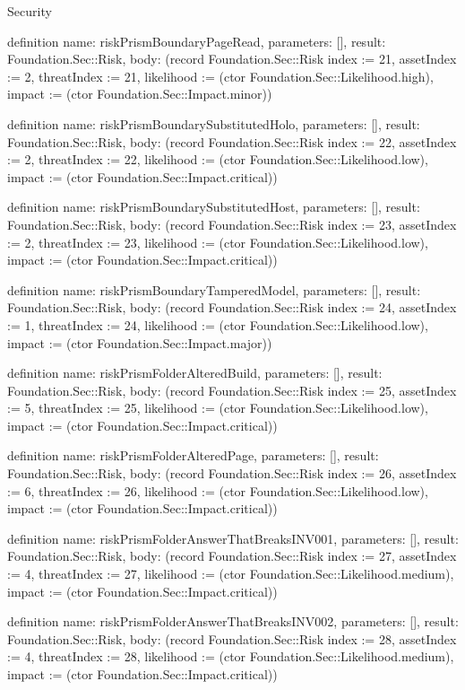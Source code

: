 \begin{lexlean}{Security}
\begin{semanticmodule}
definition{
  name: riskPrismBoundaryPageRead,
  parameters: [],
  result: Foundation.Sec::Risk,
  body: (record Foundation.Sec::Risk {index := 21, assetIndex := 2, threatIndex := 21, likelihood := (ctor Foundation.Sec::Likelihood.high), impact := (ctor Foundation.Sec::Impact.minor)})
}

definition{
  name: riskPrismBoundarySubstitutedHolo,
  parameters: [],
  result: Foundation.Sec::Risk,
  body: (record Foundation.Sec::Risk {index := 22, assetIndex := 2, threatIndex := 22, likelihood := (ctor Foundation.Sec::Likelihood.low), impact := (ctor Foundation.Sec::Impact.critical)})
}

definition{
  name: riskPrismBoundarySubstitutedHost,
  parameters: [],
  result: Foundation.Sec::Risk,
  body: (record Foundation.Sec::Risk {index := 23, assetIndex := 2, threatIndex := 23, likelihood := (ctor Foundation.Sec::Likelihood.low), impact := (ctor Foundation.Sec::Impact.critical)})
}

definition{
  name: riskPrismBoundaryTamperedModel,
  parameters: [],
  result: Foundation.Sec::Risk,
  body: (record Foundation.Sec::Risk {index := 24, assetIndex := 1, threatIndex := 24, likelihood := (ctor Foundation.Sec::Likelihood.low), impact := (ctor Foundation.Sec::Impact.major)})
}

definition{
  name: riskPrismFolderAlteredBuild,
  parameters: [],
  result: Foundation.Sec::Risk,
  body: (record Foundation.Sec::Risk {index := 25, assetIndex := 5, threatIndex := 25, likelihood := (ctor Foundation.Sec::Likelihood.low), impact := (ctor Foundation.Sec::Impact.critical)})
}

definition{
  name: riskPrismFolderAlteredPage,
  parameters: [],
  result: Foundation.Sec::Risk,
  body: (record Foundation.Sec::Risk {index := 26, assetIndex := 6, threatIndex := 26, likelihood := (ctor Foundation.Sec::Likelihood.low), impact := (ctor Foundation.Sec::Impact.critical)})
}

definition{
  name: riskPrismFolderAnswerThatBreaksINV001,
  parameters: [],
  result: Foundation.Sec::Risk,
  body: (record Foundation.Sec::Risk {index := 27, assetIndex := 4, threatIndex := 27, likelihood := (ctor Foundation.Sec::Likelihood.medium), impact := (ctor Foundation.Sec::Impact.critical)})
}

definition{
  name: riskPrismFolderAnswerThatBreaksINV002,
  parameters: [],
  result: Foundation.Sec::Risk,
  body: (record Foundation.Sec::Risk {index := 28, assetIndex := 4, threatIndex := 28, likelihood := (ctor Foundation.Sec::Likelihood.medium), impact := (ctor Foundation.Sec::Impact.critical)})
}


\end{semanticmodule}
\end{lexlean}
